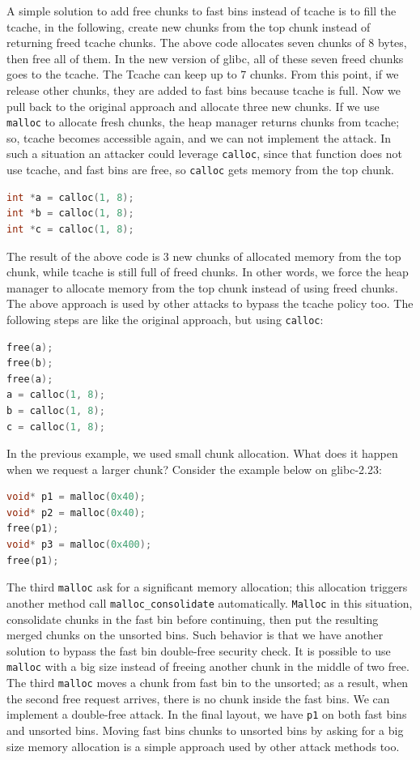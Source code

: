 \documentclass{masterthesis}
\newcommand*\libc{glibc}
\newcommand*\tch{tcache}
\newcommand*\fb{fast bins}
\newcommand*\ub{unsorted bins}
\newcommand*\Tch{Tcache\xspace}
\newcommand*\mallocc{\lstinline{malloc}\xspace}
\newcommand*\callocc{\lstinline{calloc}\xspace}
\newcommand*\Mallocc{\lstinline{Malloc}\xspace}
\begin{document}
A simple solution to add free chunks to \fb{} instead of \tch{} is to fill the \tch{}, in the following, create new chunks from the top chunk instead of returning freed \tch{} chunks. The above code allocates seven chunks of 8 bytes, then free all of them. In the new version of \libc{}, all of these seven freed chunks goes to the \tch{}. The \Tch{} can keep up to 7 chunks. From this point, if we release other chunks, they are added to \fb{} because \tch{} is full. Now we pull back to the original approach and allocate three new chunks. If we use \mallocc{} to allocate fresh chunks, the heap manager returns chunks from \tch{}; so, \tch{} becomes accessible again, and we can not implement the attack. In such a situation an attacker could leverage \callocc{}, since that function does not use \tch{}, and \fb{} are free, so \callocc{} gets memory from the top chunk.

\begin{lstlisting}[language=c,frame=tlrb]
int *a = calloc(1, 8);
int *b = calloc(1, 8);
int *c = calloc(1, 8);
\end{lstlisting}

The result of the above code is 3 new chunks of allocated memory from the top chunk, while \tch{} is still full of freed chunks. In other words, we force the heap manager to allocate memory from the top chunk instead of using freed chunks. The above approach is used by other attacks to bypass the \tch{} policy too. The following steps are like the original approach, but using \callocc{}:

\begin{lstlisting}[language=c,frame=tlrb]
free(a);
free(b);
free(a);
a = calloc(1, 8);
b = calloc(1, 8);
c = calloc(1, 8);
\end{lstlisting}

In the previous example, we used small chunk allocation. What does it happen when we request a larger chunk? Consider the example below on \libc{-2.23}:

\begin{lstlisting}[language=c,frame=tlrb]
void* p1 = malloc(0x40);
void* p2 = malloc(0x40);
free(p1);
void* p3 = malloc(0x400);
free(p1);
\end{lstlisting}

The third \mallocc{} ask for a significant memory allocation; this allocation triggers another method call \lstinline{malloc_consolidate} automatically. \Mallocc{} in this situation, consolidate chunks in the fast bin before continuing, then put the resulting merged chunks on the \ub{}.
Such behavior is that we have another solution to bypass the fast bin double-free security check. It is possible to use \mallocc{} with a big size instead of freeing another chunk in the middle of two free. The third \mallocc{} moves a chunk from fast bin to the unsorted; as a result, when the second free request arrives, there is no chunk inside the \fb{}. We can implement a double-free attack. In the final layout, we have \lstinline{p1} on both \fb{} and \ub{}. Moving \fb{} chunks to \ub{} by asking for a big size memory allocation is a simple approach used by other attack methods too.
\end{document}
